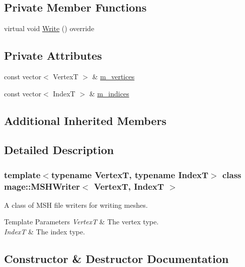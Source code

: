 \subsection*{Private Member Functions}
\begin{DoxyCompactItemize}
\item 
virtual void \hyperlink{classmage_1_1_m_s_h_writer_ab97c9570c45bff97d88700d0dcf3ed75}{Write} () override
\end{DoxyCompactItemize}
\subsection*{Private Attributes}
\begin{DoxyCompactItemize}
\item 
const vector$<$ VertexT $>$ \& \hyperlink{classmage_1_1_m_s_h_writer_ac0fc94011fd8200a83082201eee5ded5}{m\+\_\+vertices}
\item 
const vector$<$ IndexT $>$ \& \hyperlink{classmage_1_1_m_s_h_writer_a01cf9e635af683a1a9d6fa347b219dee}{m\+\_\+indices}
\end{DoxyCompactItemize}
\subsection*{Additional Inherited Members}


\subsection{Detailed Description}
\subsubsection*{template$<$typename VertexT, typename IndexT$>$\newline
class mage\+::\+M\+S\+H\+Writer$<$ Vertex\+T, Index\+T $>$}

A class of M\+SH file writers for writing meshes.


\begin{DoxyTemplParams}{Template Parameters}
{\em VertexT} & The vertex type. \\
\hline
{\em IndexT} & The index type. \\
\hline
\end{DoxyTemplParams}


\subsection{Constructor \& Destructor Documentation}
\hypertarget{classmage_1_1_m_s_h_writer_a4b74333888706ab61c9d6c3b6fefd4c5}{}\label{classmage_1_1_m_s_h_writer_a4b74333888706ab61c9d6c3b6fefd4c5} 
